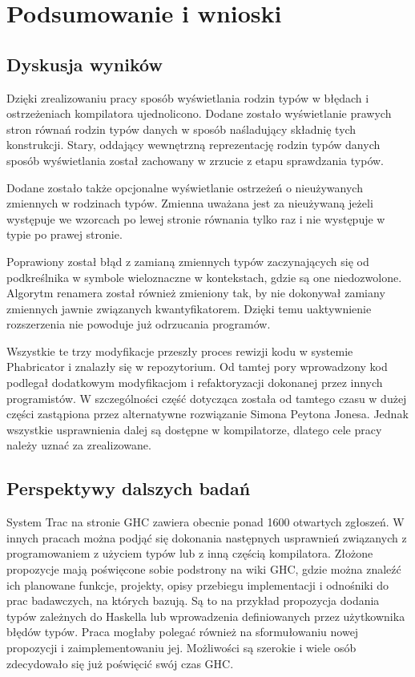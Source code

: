 \chapter{Podsumowanie i wnioski}\label{chap:podsumowanie}

\section{Dyskusja wyników}

Dzięki zrealizowaniu pracy sposób wyświetlania rodzin typów w błędach i
ostrzeżeniach kompilatora ujednolicono. Dodane zostało wyświetlanie prawych
stron równań rodzin typów danych w sposób naśladujący składnię tych
konstrukcji. Stary, oddający wewnętrzną reprezentację rodzin typów danych sposób
wyświetlania został zachowany w zrzucie z etapu sprawdzania typów.

Dodane zostało także opcjonalne wyświetlanie ostrzeżeń o nieużywanych zmiennych
w rodzinach typów. Zmienna uważana jest za nieużywaną jeżeli występuje we
wzorcach po lewej stronie równania tylko raz i nie występuje w typie po prawej
stronie.

Poprawiony został błąd z zamianą zmiennych typów zaczynających się od
podkreślnika w symbole wieloznaczne w kontekstach, gdzie są one
niedozwolone. Algorytm renamera został również zmieniony tak, by nie dokonywał
zamiany zmiennych jawnie związanych kwantyfikatorem. Dzięki temu uaktywnienie
rozszerzenia  nie powoduje już odrzucania programów.

Wszystkie te trzy modyfikacje przeszły proces rewizji kodu w systemie
Phabricator i znalazły się w repozytorium. Od tamtej pory wprowadzony kod
podlegał dodatkowym modyfikacjom i refaktoryzacji dokonanej przez innych
programistów. W szczególności część dotycząca  została od
tamtego czasu w dużej części zastąpiona przez alternatywne rozwiązanie Simona
Peytona Jonesa. Jednak wszystkie usprawnienia dalej są dostępne w
kompilatorze, dlatego cele pracy należy uznać za zrealizowane.

\section{Perspektywy dalszych badań}
System Trac na stronie GHC zawiera obecnie ponad 1600 otwartych
zgłoszeń\cite{WikiTickets}. W innych pracach można podjąć się dokonania następnych
usprawnień związanych z programowaniem z użyciem typów lub z inną częścią
kompilatora. Złożone propozycje mają poświęcone sobie podstrony na wiki GHC,
gdzie można znaleźć ich planowane funkcje, projekty, opisy przebiegu
implementacji i odnośniki do prac badawczych, na których bazują. Są to na
przykład propozycja dodania typów zależnych do Haskella lub wprowadzenia
definiowanych przez użytkownika błędów typów. Praca mogłaby polegać również na
sformułowaniu nowej propozycji i zaimplementowaniu jej. Możliwości są szerokie i
wiele osób zdecydowało się już poświęcić swój czas GHC.
